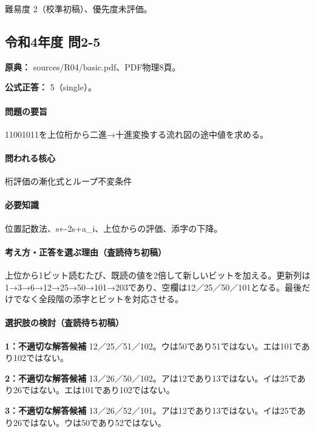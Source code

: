 \par 難易度 2（校準初稿）、優先度未評価。

\subsection{令和4年度 問2-5}
\label{q:r04-reg-basic-2-5}

\noindent\textbf{原典：} sources/R04/basic.pdf、PDF物理8頁。

\textbf{公式正答：} 5（single）。

\paragraph{問題の要旨} 11001011を上位桁から二進→十進変換する流れ図の途中値を求める。

\paragraph{問われる核心} 桁評価の漸化式とループ不変条件

\paragraph{必要知識} 位置記数法、s←2s+a\_i、上位からの評価、添字の下降。

\paragraph{考え方・正答を選ぶ理由（査読待ち初稿）} 上位から1ビット読むたび、既読の値を2倍して新しいビットを加える。更新列は1→3→6→12→25→50→101→203であり、空欄は12／25／50／101となる。最後だけでなく全段階の添字とビットを対応させる。

\paragraph{選択肢の検討（査読待ち初稿）}\mbox{}\par

\noindent\textbf{1：不適切な解答候補} 12／25／51／102。ウは50であり51ではない。エは101であり102ではない。\par

\noindent\textbf{2：不適切な解答候補} 13／26／50／102。アは12であり13ではない。イは25であり26ではない。エは101であり102ではない。\par

\noindent\textbf{3：不適切な解答候補} 13／26／52／101。アは12であり13ではない。イは25であり26ではない。ウは50であり52ではない。\par

